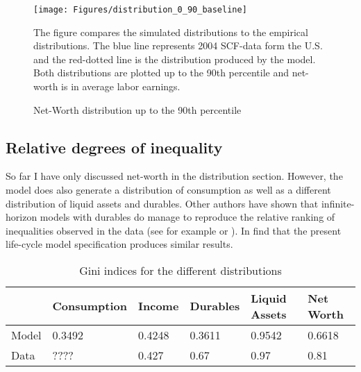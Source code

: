 \documentclass[12pt,a4paper,leqno]{article}
\theoremstyle{definition}
\begin{document}
\begin{figure}[!htbp]
\caption{Net-Worth distribution up to the 90th percentile} 
\label{wealth_distr_base}	%
\centering
\texttt{[image: Figures/distribution\_0\_90\_baseline]}  %

\begin{minipage}{0.8\linewidth}
\footnotesize{The figure compares the simulated distributions to the empirical distributions. The blue line represents 2004 SCF-data form the U.S. and the red-dotted line is the distribution produced by the model. Both distributions are plotted up to the 90th percentile and net-worth is in average labor earnings.}
\end{minipage}

\end{figure}


\subsection{Relative degrees of inequality}
So far I have only discussed net-worth in the distribution section. However, the model does also generate a distribution of consumption as well as a different distribution of liquid assets and durables. Other authors have shown that infinite-horizon models with durables do manage to reproduce the relative ranking of inequalities observed in the data (see for example \cite{hintermaier2010} or \cite{diaz2010}). In find that the present life-cycle model specification produces similar results.


\begin{table}[!htbp]
\centering
\caption{Gini indices for the different distributions}
\label{Gini_Ranking}
\begin{tabular}{@{}llllll@{}}
\toprule
      & Consumption & Income & Durables & Liquid Assets & Net Worth \\ \midrule
Model & 0.3492      & 0.4248 & 0.3611   & 0.9542        & 0.6618    \\ \midrule
Data  & ????        & 0.427  & 0.67     & 0.97          & 0.81      \\ \bottomrule
\end{tabular}
\end{table}
\end{document}

